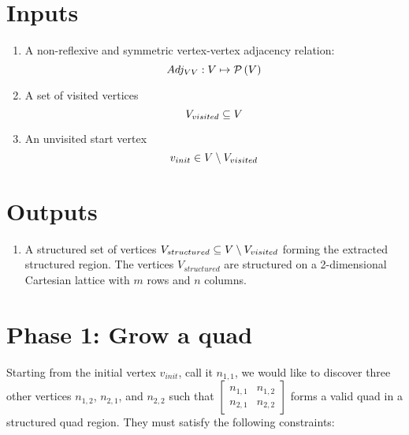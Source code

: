 \newcommand{\Structured}{V_{structured}}

\newcommand{\vinit}{v_{init}}

\newcommand{\Quad}[4]{\begin{bmatrix} #1 & #2 \\ #3 & #4 \end{bmatrix}}

\newcommand{\Qinit}{\Quad{n_{1,1}} {n_{1,2}} {n_{2,1}} {n_{2,2}} }

\newcommand{\Qinitmirror}{ \Quad {n_{1,2}} {n_{1,1}} {n_{2,2}} {n_{2,1}} }



\section{Inputs}
\begin{enumerate}
\item A non-reflexive and symmetric vertex-vertex adjacency relation:
$$ Adj_{VV}: V \mapsto \mathcal P \left({V}\right) $$

\item A set of visited vertices
$$ V_{visited} \subseteq V $$

\item An unvisited start vertex
$$ \vinit \in \VertexSet \setminus \Visited $$
\end{enumerate}


\section{Outputs}
\begin{enumerate}
\item A structured set of vertices $\Structured \subseteq \VertexSet \setminus \Visited $ forming the extracted structured region.
The vertices $\Structured$ are structured on a 2-dimensional Cartesian lattice with $m$ rows and $n$ columns.
\end{enumerate}



\section{Phase 1: Grow a quad}
\label{sec:grow_a_quad}
Starting from the initial vertex $\vinit$, call it $n_{1,1}$, we would like to discover three other vertices $n_{1,2}$, $n_{2,1}$, and $n_{2,2}$ such that $\Qinit$ forms a valid quad in a structured quad region. They must satisfy the following constraints:

